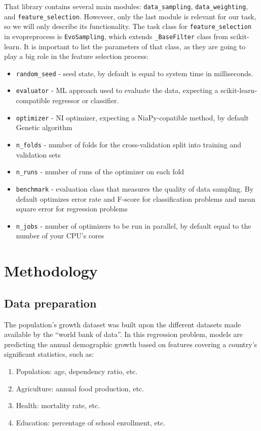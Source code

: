 \documentclass[conference]{IEEEtran}
\begin{document}
That library contains several main modules: \texttt{data\_sampling}, \texttt{data\_weighting}, and \texttt{feature\_selection}. Howeveer, only the last module is relevant for our task, so we will only describe its functionality. The task class for \texttt{feature\_selection} in evopreprocess is \texttt{EvoSampling}, which extends \texttt{\_BaseFilter} class from scikit-learn. It is important to list the parameters of that class, as they are going to play a big role in the feature selection process:
\begin{itemize}
	\item \texttt{random\_seed} - seed state, by default is equal to system time in milliseconds.
	\item \texttt{evaluator} - ML approach used to evaluate the data, expecting a scikit-learn-compatible regressor or classifier.
	\item \texttt{optimizer} - NI optimizer, expecting a NiaPy-copatible method, by default Genetic algorithm
	\item \texttt{n\_folds} - number of folds for the cross-validation split into training and validation sets
	\item \texttt{n\_runs} - number of runs of the optimizer on each fold
	\item \texttt{benchmark} - evaluation class that measures the quality of data sampling. By default optimizes error rate and F-score for classification problems and mean square error for regression problems
	\item \texttt{n\_jobs} - number of optimizers to be run in parallel, by default equal to the number of your CPU's cores
\end{itemize}

\section{Methodology}

\subsection{Data preparation}

The population’s growth dataset was built upon the different datasets made available by the “world bank of data”\cite{world_bank_moment}. In this regression problem, models are predicting the annual demographic growth based on features covering a country’s significant statistics\cite{kelley1973population}\cite{sinnathurai2013empirical}, such as: 
\begin{enumerate}
	\item Population: age, dependency ratio, etc.
	\item Agriculture: annual food production, etc.
	\item Health: mortality rate, etc.
	\item Education: percentage of school enrollment, etc.
\end{enumerate}
\end{document}
